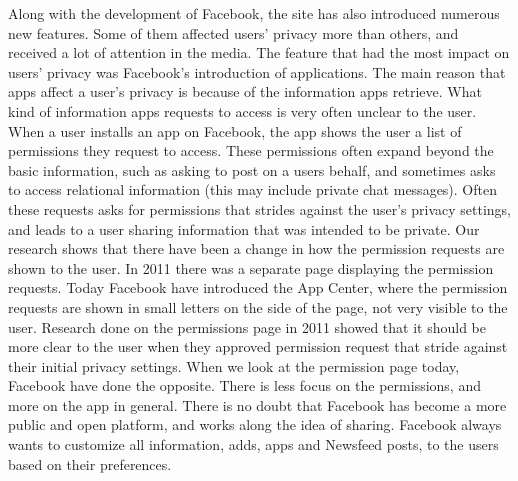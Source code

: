 Along with the development of Facebook, the site has also introduced numerous new features. Some of them affected users' privacy more than others, and received a lot of attention in the media. The feature that had the most impact on users' privacy was Facebook's introduction of applications. 
The main reason that apps affect a user's privacy is because of the information apps retrieve. What kind of information apps requests to access is very often unclear to the user. When a user installs an app on Facebook, the app shows the user a list of permissions they request to access. These permissions often expand beyond the basic information, such as asking to post on a users behalf, and sometimes asks to access relational information (this may include private chat messages). Often these requests asks for permissions that strides against the user's privacy settings, and leads to a user sharing information that was intended to be private. Our research shows that there have been a change in how the permission requests are shown to the user. In 2011 there was a separate page displaying the permission requests. Today Facebook have introduced the App Center, where the permission requests are shown in small letters on the side of the page, not very visible to the user. Research done on the permissions page in 2011 showed that it should be more clear to the user when they approved permission request that stride against their initial privacy settings. When we look at the permission page today, Facebook have done the opposite. There is less focus on the permissions, and more on the app in general.  
There is no doubt that Facebook has become a more public and open platform, and works along the idea of sharing. Facebook always wants to customize all information, adds, apps and Newsfeed posts, to the users based on their preferences.

